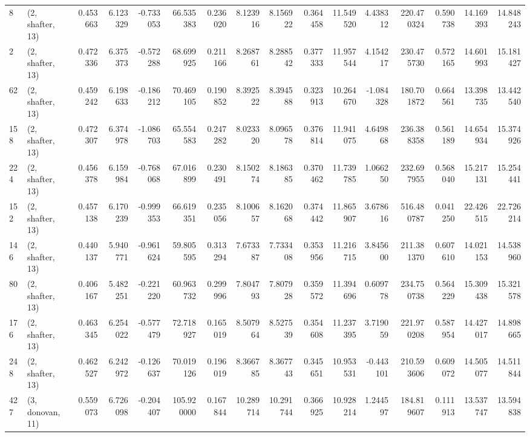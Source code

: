 \begin{tabular}{llrrrrrrrrrrrrrr}
8   &  (2, shafter, 13) &   0.453663 &   6.123329 &  -0.733053 &    66.535383 &   0.236020 &   8.123916 &   8.156922 &  0.364458 &  11.549520 &   4.438312 &   220.470324 &  0.590738 &  14.169393 &  14.848243 \\
2   &  (2, shafter, 13) &   0.472336 &   6.375373 &  -0.572288 &    68.699925 &   0.211166 &   8.268761 &   8.288542 &  0.377333 &  11.957544 &   4.154217 &   230.475730 &  0.572165 &  14.601993 &  15.181427 \\
62  &  (2, shafter, 13) &   0.459242 &   6.198633 &  -0.186212 &    70.469105 &   0.190852 &   8.392522 &   8.394588 &  0.323913 &  10.264670 &  -1.084328 &   180.701872 &  0.664561 &  13.398735 &  13.442540 \\
158 &  (2, shafter, 13) &   0.472307 &   6.374978 &  -1.086703 &    65.554583 &   0.247282 &   8.023320 &   8.096578 &  0.376814 &  11.941075 &   4.649868 &   236.388358 &  0.561189 &  14.654934 &  15.374926 \\
224 &  (2, shafter, 13) &   0.456378 &   6.159984 &  -0.768068 &    67.016899 &   0.230491 &   8.150274 &   8.186385 &  0.370462 &  11.739785 &   1.066250 &   232.697955 &  0.568040 &  15.217131 &  15.254441 \\
152 &  (2, shafter, 13) &   0.457138 &   6.170239 &  -0.999353 &    66.619351 &   0.235056 &   8.100657 &   8.162068 &  0.374442 &  11.865907 &   3.678616 &   516.480787 &  0.041250 &  22.426515 &  22.726214 \\
146 &  (2, shafter, 13) &   0.440137 &   5.940771 &  -0.961624 &    59.805595 &   0.313294 &   7.673387 &   7.733408 &  0.353956 &  11.216715 &   3.845600 &   211.381370 &  0.607610 &  14.021153 &  14.538960 \\
80  &  (2, shafter, 13) &   0.406167 &   5.482251 &  -0.221220 &    60.963732 &   0.299996 &   7.804793 &   7.807928 &  0.359572 &  11.394696 &   0.609778 &   234.750738 &  0.564229 &  15.309438 &  15.321578 \\
176 &  (2, shafter, 13) &   0.463345 &   6.254022 &  -0.577479 &    72.718927 &   0.165019 &   8.507964 &   8.527539 &  0.354608 &  11.237395 &   3.719059 &   221.970208 &  0.587954 &  14.427017 &  14.898665 \\
248 &  (2, shafter, 13) &   0.462527 &   6.242972 &  -0.126637 &    70.019126 &   0.196019 &   8.366785 &   8.367743 &  0.345651 &  10.953531 &  -0.443101 &   210.593606 &  0.609072 &  14.505077 &  14.511844 \\
427 &  (3, donovan, 11) &   0.559073 &   6.726098 &  -0.204407 &   105.920000 &   0.167844 &  10.289714 &  10.291744 &  0.366925 &  10.928214 &   1.244597 &   184.819607 &  0.111913 &  13.537747 &  13.594838 \\

\end{tabular}
